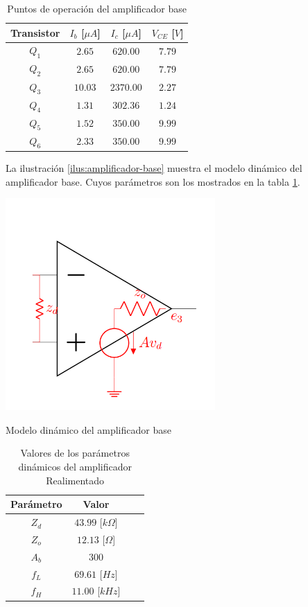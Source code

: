 \documentclass{article}
\begin{document}
\begin{table}[ht]
\centering
\begin{tabular}{|c|c|c|c|}
        \hline
        \textbf{Transistor} & $I_b$ [$\mu A$] & $I_c$ [$\mu A$] & $V_{CE}$ [$V$] \\ \hline
        $Q_1$ & $2.65$ & $620.00 $ & $7.79$ \\ \hline
        $Q_2$ & $2.65$ & $620.00 $ & $7.79$ \\ \hline
        $Q_3$ & $10.03$ & $2370.00 $ & $2.27$ \\ \hline
        $Q_4$ & $1.31$ & $302.36$ & $1.24$ \\ \hline
        $Q_5$ & $1.52 $ & $350.00$ & $9.99$ \\ \hline
        $Q_6$ & $2.33 $ & $350.00$ & $9.99$ \\ \hline
\end{tabular}
\caption{Puntos de operación del amplificador base}
\end{table}

La ilustración \ref{ilus:amplificador-base} muestra el modelo dinámico del amplificador base. Cuyos parámetros son los mostrados en la tabla \ref{tab:amplificador-base-dinamico}.

\begin{ilustracion}[ht]
    \centering
    \includegraphics[width=0.6\textwidth]{src/images/modelo-amplificador.png}
    \caption{Modelo dinámico del amplificador base}
    \label{ilus:amplificador-base}
\end{ilustracion}

\begin{table}[ht]
    \centering
    \label{tab:amplificador-base-dinamico}
    \begin{tabular}{|c|c|c|c|}
        \hline
        \textbf{Parámetro} & \textbf{Valor} \\ \hline
        $Z_d$ & $43.99$ [$k\Omega$] \\ \hline
        $Z_o$ & $12.13 $ [$\Omega$] \\ \hline
        $A_b$ & $300$ \\ \hline
        $f_L$ & $69.61$ [$Hz$] \\ \hline
        $f_H$ & $11.00$ [$kHz$] \\ \hline
    \end{tabular}
    \caption{Valores de los parámetros dinámicos del amplificador Realimentado}

\end{table}
\end{document}
